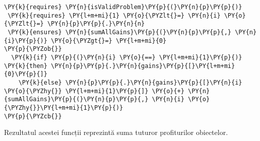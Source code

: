 \begin{sloppypar}
\begin{enumerate}
\begin{Verbatim}[commandchars=\\\{\}]
 \PY{k}{requires} \PY{n}{isValidProblem}\PY{p}{(}\PY{n}{p}\PY{p}{)}
 \PY{k}{requires} \PY{l+m+mi}{1} \PY{o}{\PYZlt{}=} \PY{n}{i} \PY{o}{\PYZlt{}=} \PY{n}{p}\PY{p}{.}\PY{n}{n}
 \PY{k}{ensures} \PY{n}{sumAllGains}\PY{p}{(}\PY{n}{p}\PY{p}{,} \PY{n}{i}\PY{p}{)} \PY{o}{\PYZgt{}=} \PY{l+m+mi}{0}
\PY{p}{\PYZob{}}
  \PY{k}{if} \PY{p}{(}\PY{n}{i} \PY{o}{==} \PY{l+m+mi}{1}\PY{p}{)} \PY{k}{then} \PY{n}{p}\PY{p}{.}\PY{n}{gains}\PY{p}{[}\PY{l+m+mi}{0}\PY{p}{]} 
    \PY{k}{else} \PY{n}{p}\PY{p}{.}\PY{n}{gains}\PY{p}{[}\PY{n}{i} \PY{o}{\PYZhy{}} \PY{l+m+mi}{1}\PY{p}{]} \PY{o}{+} \PY{n}{sumAllGains}\PY{p}{(}\PY{n}{p}\PY{p}{,} \PY{n}{i} \PY{o}{\PYZhy{}}\PY{l+m+mi}{1}\PY{p}{)}
\PY{p}{\PYZcb{}}
\end{Verbatim} 
    Rezultatul acestei funcții reprezintă suma tuturor profiturilor obiectelor.
\end{enumerate}

\end{sloppypar}